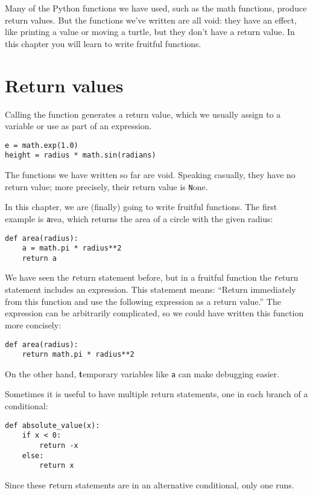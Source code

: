 \documentclass[
DIV=11,
fontsize=12,
twoside,
headinclude=false,
titlepage=firstiscover,
abstract=true,
headsepline=true,
footsepline=true,
chapterprefix=true, %
headings=big,
bibliography=totoc,%
captions=tableheading
]{scrbook}
\theoremstyle{definition}
\begin{document}
Many of the Python functions we have used, such as the math
functions, produce return values.  But the functions we've written
are all void: they have an effect, like printing a value
or moving a turtle, but they don't have a return value.  In
this chapter you will learn to write fruitful functions.


\section{Return values}

Calling the function generates a return
value, which we usually assign to a variable or use as part of an
expression.

\begin{lstlisting}
e = math.exp(1.0)
height = radius * math.sin(radians)
\end{lstlisting}
%
The functions we have written so far are void.  Speaking casually,
they have no return value; more precisely,
their return value is {\texttt None}.

In this chapter, we are (finally) going to write fruitful functions.
The first example is {\texttt area}, which returns the area of a circle
with the given radius:

\begin{lstlisting}
def area(radius):
    a = math.pi * radius**2
    return a
\end{lstlisting}
%
We have seen the {\texttt return} statement before, but in a fruitful
function the {\texttt return} statement includes
an expression.  This statement means: ``Return immediately from
this function and use the following expression as a return value.''
The expression can be arbitrarily complicated, so we could
have written this function more concisely:

\begin{lstlisting}
def area(radius):
    return math.pi * radius**2
\end{lstlisting}
%
On the other hand, {\textbf temporary variables} like {\texttt a} can make
debugging easier.

Sometimes it is useful to have multiple return statements, one in each
branch of a conditional:

\begin{lstlisting}
def absolute_value(x):
    if x < 0:
        return -x
    else:
        return x
\end{lstlisting}
%
Since these {\texttt return} statements are in an alternative conditional,
only one runs.
\end{document}
